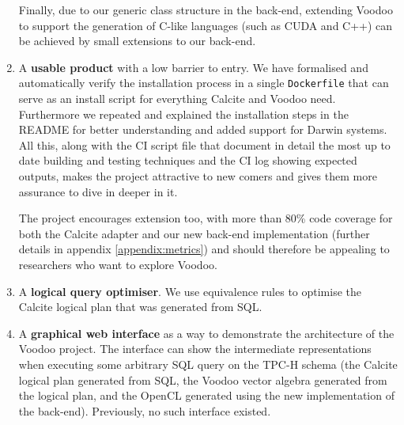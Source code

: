 \begin{enumerate}
    Finally, due to our generic class structure in the back-end, extending Voodoo to support the generation of C-like languages (such as CUDA and C++) can be achieved by small extensions to our back-end.
    
    \item A \textbf{usable product} with a low barrier to entry. We have formalised and automatically verify the installation process in a single \texttt{Dockerfile} that can serve as an install script for everything Calcite and Voodoo need. Furthermore we repeated and explained the installation steps in the README for better understanding and added support for Darwin systems. All this, along with the CI script file that document in detail the most up to date building and testing techniques and the CI log showing expected outputs, makes the project attractive to new comers and gives them more assurance to dive in deeper in it. 
    
    The project encourages extension too, with more than 80\% code coverage for both the Calcite adapter and our new back-end implementation (further details in appendix \ref{appendix:metrics}) and should therefore be appealing to researchers who want to explore Voodoo.
    
    \item A \textbf{logical query optimiser}. We use equivalence rules to optimise the Calcite logical plan that was generated from SQL.
    
    \item A \textbf{graphical web interface} as a way to demonstrate the architecture of the Voodoo project. The interface can show the intermediate representations when executing some arbitrary SQL query on the TPC-H schema (the Calcite logical plan generated from SQL, the Voodoo vector algebra generated from the logical plan, and the OpenCL generated using the new implementation of the back-end). Previously, no such interface existed.
\end{enumerate}





